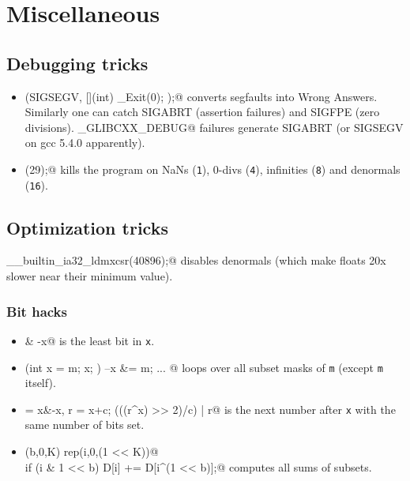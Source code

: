 \chapter{Miscellaneous}



\section{Debugging tricks}
	\begin{itemize}
		\item \verb@signal(SIGSEGV, [](int) { _Exit(0); });@ converts segfaults into Wrong Answers.
			Similarly one can catch SIGABRT (assertion failures) and SIGFPE (zero divisions).
			\verb@_GLIBCXX_DEBUG@ failures generate SIGABRT (or SIGSEGV on gcc 5.4.0 apparently).
		\item \verb@feenableexcept(29);@ kills the program on NaNs (\texttt 1), 0-divs (\texttt 4), infinities (\texttt 8) and denormals (\texttt{16}).
	\end{itemize}

\section{Optimization tricks}
	\verb@__builtin_ia32_ldmxcsr(40896);@ disables denormals (which make floats 20x slower near their minimum value).
	\subsection{Bit hacks}
		\begin{itemize}
			\item \verb@x & -x@ is the least bit in \texttt{x}.
			\item \verb@for (int x = m; x; ) { --x &= m; ... }@ loops over all subset masks of \texttt{m} (except \texttt{m} itself).
			\item \verb@c = x&-x, r = x+c; (((r^x) >> 2)/c) | r@ is the next number after \texttt{x} with the same number of bits set.
			\item \verb@rep(b,0,K) rep(i,0,(1 << K))@ \\ \verb@  if (i & 1 << b) D[i] += D[i^(1 << b)];@ computes all sums of subsets.
		\end{itemize}
